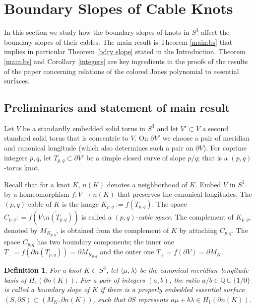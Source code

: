 \documentclass[11pt]{amsart}
\newtheorem{define}[theorem]{Definition}
\theoremstyle{definition}
\newcommand{\QQ}{{\mathbb{Q}}}
\newcommand{\bdy}{{\partial}}
\newcommand{\M}{M_{K_{p,q}}}
\newcommand{\C}{{C_{p, q}}}
\begin{document}
\section{Boundary Slopes of Cable Knots}\label{boundary-slopes}
 In this section we study how the boundary slopes of knots in $S^3$ affect the boundary slopes 
of their cables. The main result is Theorem \ref{main:bs} that implies in particular  Theorem \ref{bdry slope} stated in the Introduction.
Theorem \ref{main:bs} and Corollary \ref{integers} are key ingredients in the proofs of the results of the paper concerning
relations of the colored Jones polynomial to essential surfaces.  
\smallskip

\subsection{Preliminaries and statement of main result} Let $V$  be a standardly embedded solid torus in $S^3$ and let $V'\subset V$ a second standard solid torus 
that is concentric to $V$. On $\partial V'$  we choose a pair of meridian and canonical longitude  (which also determines such a pair on $\partial V$).  For coprime integers $p,q$, let  $T_{p,q}\subset \partial V'$ be a simple closed curve
of slope $p/q$; that is a $(p, q)$-torus knot.

Recall that for a knot  $K$, $n(K)$  denotes  a neighborhood of $K$.  Embed $V$ in $S^3$ by a  homeomorphism   $f: V\longrightarrow n(K)$
that preserves the canonical longitudes. The $(p,q)$-cable of $K$ is the image
$K_{p,q}:= f(T_{p, q})$.  
The space $C_{p, q}: =f(\overline{V\setminus n(T_{p, q})})$
is called a  $(p,q)$-\emph{cable space}.  The complement of  $K_{p,q}$, denoted by $\M$,
is obtained from the complement of $K$ by attaching $\C$.
The space $\C$ has two boundary components; the inner one $T_{-}=f( \partial n(T_{p, q}))=\partial\M$
and the outer one $T_{+}=f(\partial V)=\partial M_K$.



\begin{define}  \label{bdryslopes} For a knot $K\subset S^3$,  let $\langle \mu, \lambda \rangle$ be the canonical
meridian--longitude basis of $H_1 (\bdy n(K))$.  For a pair of integers $(a, b)$,  the ratio  $a/b \in
{\QQ}\cup \{ 1/0\}$ is called a \emph{boundary slope} of $K$ if there
is a properly embedded essential surface $(S, \bdy S) \subset (M_K,
\bdy n(K))$, such that  $\bdy S$ represents  $a \mu + b \lambda \in
H_1 (\bdy n(K))$. 
\end{define}
\end{document}
